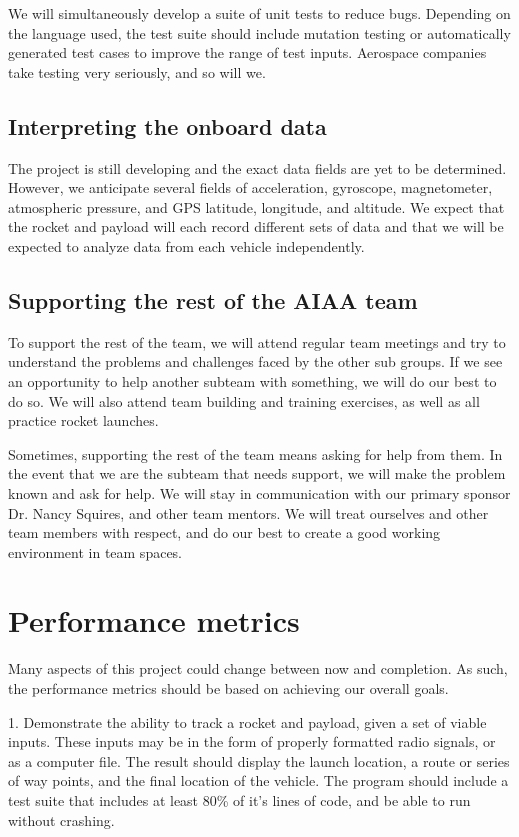 \documentclass[onecolumn, draftclsnofoot,10pt, compsoc]{IEEEtran}
\begin{document}
\par
We will simultaneously develop a suite of unit tests to reduce bugs. Depending on the language used, the test suite should include mutation testing or automatically generated test cases to improve the range of test inputs.  Aerospace companies take testing very seriously, and so will we.

\subsection{Interpreting the onboard data}
The project is still developing and the exact data fields are yet to be determined.  However, we anticipate several fields of acceleration, gyroscope, magnetometer, atmospheric pressure, and GPS latitude, longitude, and altitude.  We expect that the rocket and payload will each record different sets of data and that we will be expected to analyze data from each vehicle independently.

\subsection{Supporting the rest of the AIAA team}
To support the rest of the team, we will attend regular team meetings and try to understand the problems and challenges faced by the other sub groups.  If we see an opportunity to help another subteam with something, we will do our best to do so.  We will also attend team building and training exercises, as well as all practice rocket launches.

\par
Sometimes, supporting the rest of the team means asking for help from them.  In the event that we are the subteam that needs support, we will make the problem known and ask for help.  We will stay in communication with our primary sponsor Dr. Nancy Squires, and other team mentors.  We will treat ourselves and other team members with respect, and do our best to create a good working environment in team spaces.

\section{Performance metrics}
Many aspects of this project could change between now and completion. As such, the performance metrics should be based on achieving our overall goals.

\par
1. Demonstrate the ability to track a rocket and payload, given a set of viable inputs.  These inputs may be in the form of properly formatted radio signals, or as a computer file.  The result should display the launch location, a route or series of way points, and the final location of the vehicle. The program should include a test suite that includes at least 80\% of it's lines of code, and be able to run without crashing.
\end{document}
